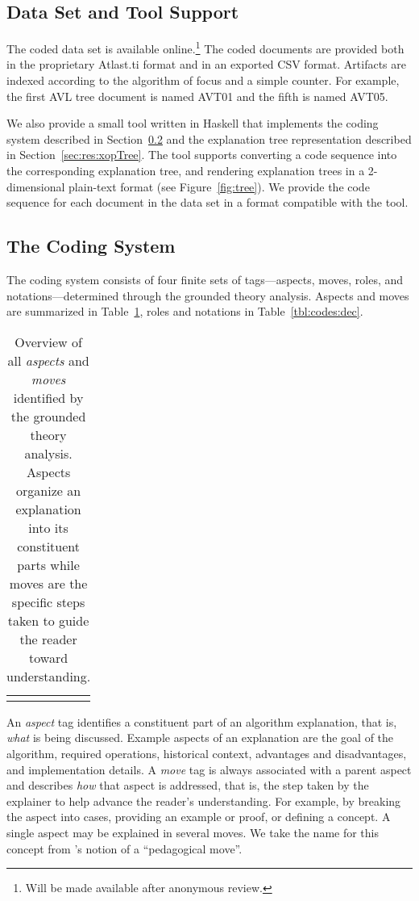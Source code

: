 \documentclass[sigconf]{acmart}
\begin{document}
\subsection{Data Set and Tool Support}
\label{sec:res:data}

The coded data set is available online.\footnote{Will be made available after
anonymous review.} The coded documents are provided both in the proprietary
Atlast.ti format and in an exported CSV format.
%
Artifacts are indexed according to the algorithm of focus and a simple counter.
For example, the first AVL tree document is named AVT01 and the fifth is named
AVT05.


We also provide a small tool written in Haskell that implements the coding
system described in Section~\ref{sec:res:sys} and the explanation tree
representation described in Section~\ref{sec:res:xopTree}. The tool supports
converting a code sequence into the corresponding explanation tree, and
rendering explanation trees in a 2-dimensional plain-text format (see
Figure~\ref{fig:tree}).
%
We provide the code sequence for each document in the data set in a format
compatible with the tool.


\subsection{The Coding System}
\label{sec:res:sys}

The coding system consists of four finite sets of tags---aspects, moves, roles,
and notations---determined through the grounded theory analysis. Aspects and
moves are summarized in Table~\ref{tbl:codes:main}, roles and notations in
Table~\ref{tbl:codes:dec}.


\begin{table}
\begin{tabular}{ll}

\\[-1.5ex]

\\[-1.5ex]
\end{tabular}
\caption{Overview of all \emph{aspects} and \emph{moves} identified by the grounded theory
analysis. Aspects organize an explanation into its constituent parts while
moves are the specific steps taken to guide the reader toward understanding.}
\label{tbl:codes:main}
\end{table}


An \emph{aspect} tag identifies a constituent part of an algorithm explanation,
that is, \emph{what} is being discussed. Example aspects of an explanation are
the goal of the algorithm, required operations, historical context, advantages
and disadvantages, and implementation details.
%
A \emph{move} tag is always associated with a parent aspect and describes
\emph{how} that aspect is addressed, that is, the step taken by the explainer
to help advance the reader's understanding. For example, by breaking the aspect
into cases, providing an example or proof, or defining a concept. A single
aspect may be explained in several moves. We take the name for this concept
from \citet{bellack1966language}'s notion of a ``pedagogical move''.
\end{document}

